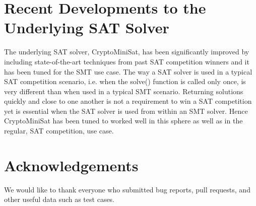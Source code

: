 \documentclass{llncs}
\begin{document}
\section{Recent Developments to the Underlying SAT Solver}
The underlying SAT solver, CryptoMiniSat, has been significantly improved by including state-of-the-art techniques from past SAT competition winners and it has been tuned for the SMT use case. The way a SAT solver is used in a typical SAT competition scenario, i.e. when the solve() function is called only once, is very different than when used in a typical SMT scenario. Returning solutions quickly and close to one another is not a requirement to win a SAT competition yet is essential when the SAT solver is used from within an SMT solver. Hence CryptoMiniSat has been tuned to worked well in this sphere as well as in the regular, SAT competition, use case.

\section*{Acknowledgements}
We would like to thank everyone who submitted bug reports, pull requests, and other useful data such as test cases.




\vfill
\pagebreak
\end{document}
